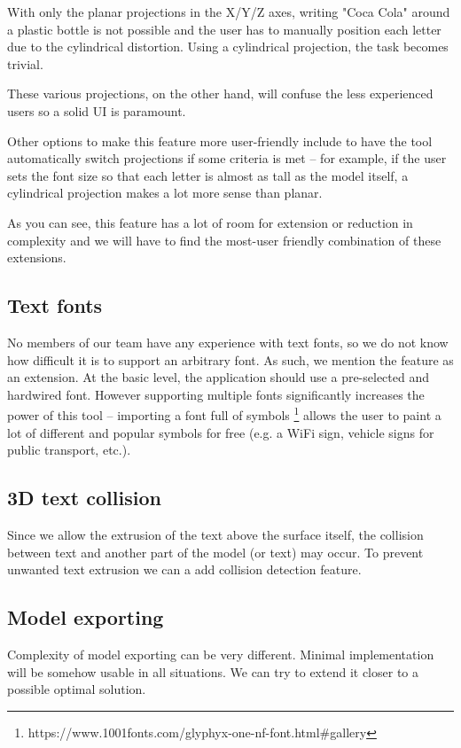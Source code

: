 With only the planar projections in the X/Y/Z axes, writing "Coca Cola" around a plastic bottle is not possible and the user has to manually position each letter due to the cylindrical distortion. Using a cylindrical projection, the task becomes trivial.

These various projections, on the other hand, will confuse the less experienced users so a solid UI is paramount.

Other options to make this feature more user-friendly include to have the tool automatically switch projections if some criteria is met -- for example, if the user sets the font size so that each letter is almost as tall as the model itself, a cylindrical projection makes a lot more sense than planar.

As you can see, this feature has a lot of room for extension or reduction in complexity and we will have to find the most-user friendly combination of these extensions.

\subsection{Text fonts}

No members of our team have any experience with text fonts, so we do not know how difficult it is to support an arbitrary font. As such, we mention the feature as an extension. At the basic level, the application should use a pre-selected and hardwired font. However supporting multiple fonts significantly increases the power of this tool -- importing a font full of symbols \footnote{https://www.1001fonts.com/glyphyx-one-nf-font.html\#gallery} allows the user to paint a lot of different and popular symbols for free (e.g. a WiFi sign, vehicle signs for public transport, etc.).

\subsection{3D text collision}

Since we allow the extrusion of the text above the surface itself, the collision between text and another part of the model (or text) may occur. To prevent unwanted text extrusion we can a add collision detection feature.


\subsection{Model exporting}

Complexity of model exporting can be very different. Minimal implementation will be somehow usable in all situations. We can try to extend it closer to a possible optimal solution.


